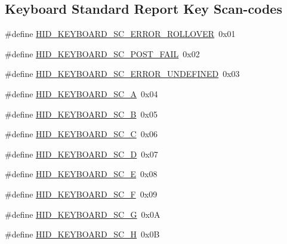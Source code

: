 \subsection*{Keyboard Standard Report Key Scan-\/codes}
\begin{DoxyCompactItemize}
\item 
\#define \hyperlink{group__Group__USBClassHIDCommon_ga3598d306c8d536e7daf88b7ed06d462e}{H\+I\+D\+\_\+\+K\+E\+Y\+B\+O\+A\+R\+D\+\_\+\+S\+C\+\_\+\+E\+R\+R\+O\+R\+\_\+\+R\+O\+L\+L\+O\+V\+ER}~0x01
\item 
\#define \hyperlink{group__Group__USBClassHIDCommon_gacc0a3a0d29e75ab5b63ce8c5eed49fc4}{H\+I\+D\+\_\+\+K\+E\+Y\+B\+O\+A\+R\+D\+\_\+\+S\+C\+\_\+\+P\+O\+S\+T\+\_\+\+F\+A\+IL}~0x02
\item 
\#define \hyperlink{group__Group__USBClassHIDCommon_ga75c5925b9bc04e730b726af57279dd1b}{H\+I\+D\+\_\+\+K\+E\+Y\+B\+O\+A\+R\+D\+\_\+\+S\+C\+\_\+\+E\+R\+R\+O\+R\+\_\+\+U\+N\+D\+E\+F\+I\+N\+ED}~0x03
\item 
\#define \hyperlink{group__Group__USBClassHIDCommon_ga8eaa3a5035d6538ae5e90e3fdbd1ac95}{H\+I\+D\+\_\+\+K\+E\+Y\+B\+O\+A\+R\+D\+\_\+\+S\+C\+\_\+A}~0x04
\item 
\#define \hyperlink{group__Group__USBClassHIDCommon_ga799cc4b9e4f494f1b5d63fd99b6410b0}{H\+I\+D\+\_\+\+K\+E\+Y\+B\+O\+A\+R\+D\+\_\+\+S\+C\+\_\+B}~0x05
\item 
\#define \hyperlink{group__Group__USBClassHIDCommon_ga6424948e7d071948a0578ecd27938e49}{H\+I\+D\+\_\+\+K\+E\+Y\+B\+O\+A\+R\+D\+\_\+\+S\+C\+\_\+C}~0x06
\item 
\#define \hyperlink{group__Group__USBClassHIDCommon_ga0e8ffebba254623ef7d2bfad96c14631}{H\+I\+D\+\_\+\+K\+E\+Y\+B\+O\+A\+R\+D\+\_\+\+S\+C\+\_\+D}~0x07
\item 
\#define \hyperlink{group__Group__USBClassHIDCommon_gace3ecf680671394fce8bbbe807d98ebd}{H\+I\+D\+\_\+\+K\+E\+Y\+B\+O\+A\+R\+D\+\_\+\+S\+C\+\_\+E}~0x08
\item 
\#define \hyperlink{group__Group__USBClassHIDCommon_ga61806b90e8afcf3959e509a576a31d20}{H\+I\+D\+\_\+\+K\+E\+Y\+B\+O\+A\+R\+D\+\_\+\+S\+C\+\_\+F}~0x09
\item 
\#define \hyperlink{group__Group__USBClassHIDCommon_ga693e5da0d24b3d2f150a41f01d5a6f21}{H\+I\+D\+\_\+\+K\+E\+Y\+B\+O\+A\+R\+D\+\_\+\+S\+C\+\_\+G}~0x0A
\item 
\#define \hyperlink{group__Group__USBClassHIDCommon_ga624ba33be4bea8a6f275462cec810f77}{H\+I\+D\+\_\+\+K\+E\+Y\+B\+O\+A\+R\+D\+\_\+\+S\+C\+\_\+H}~0x0B
\item 

\end{DoxyCompactItemize}
